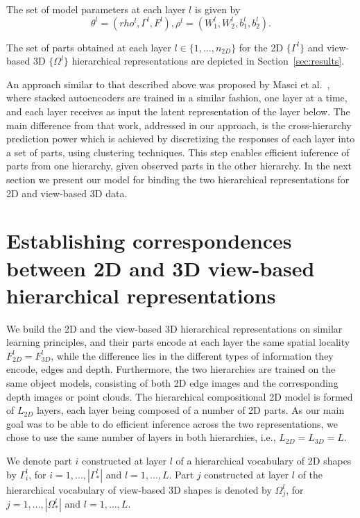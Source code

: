 \documentclass[runningheads]{llncs}
\begin{document}
The set of model parameters at each layer $l$ is  given by
\begin{equation}
\theta^l = (rho^l,\Gamma^l,F^l),
\rho^l=(W_1^l,W_2^l,b_1^l,b_2^l).
\end{equation}

The set of parts obtained at each layer $l\in\{1,\ldots,n_{2D}\}$ for the 2D $\{\Gamma^l\}$ and view-based 3D $\{\Omega^l\}$ hierarchical representations are depicted in Section~\ref{sec:results}.

An approach similar to that described above was proposed by Masci et al.~\cite{Masci2011}, where stacked autoencoders are trained in a similar fashion, one layer at a time, and each layer receives as input the latent representation of the layer below. The main difference from that work, addressed in our approach, is the cross-hierarchy prediction power which is achieved by discretizing the responses of each layer into a set of parts, using clustering techniques. This step enables efficient inference of parts from one hierarchy, given observed parts in the other hierarchy. In the next section we present our model for binding the two hierarchical representations for 2D and view-based 3D data.
 
\section{Establishing correspondences between 2D and 3D view-based hierarchical representations}
\label{sec:analysis}

We build the 2D and the view-based 3D hierarchical representations on similar learning principles, and their parts encode at each layer the same spatial locality $F_{2D}^l=F_{3D}^l$, while the difference lies in the different types of information they encode, edges and depth.
Furthermore, the two hierarchies are trained on the same object models, consisting of both 2D edge images and the corresponding depth images or point clouds.  
The hierarchical compositional 2D model is formed of $L_{2D}$ layers, each layer being composed of a number of 2D parts. 
As our main goal was to be able to do efficient inference across the two representations, we chose to use the same number of layers in both hierarchies, i.e., $L_{2D}=L_{3D}=L$.

We denote part $i$ constructed at layer $l$ of a hierarchical vocabulary of 2D shapes by $\Gamma_{i}^{l}$, for $i=1,\ldots,|\Gamma_*^l|$ and $l=1,\ldots,L$. Part $j$ constructed at layer $l$ of the  hierarchical vocabulary of view-based 3D shapes is denoted by $\Omega_{j}^{l}$, for $j=1,\ldots,|\Omega_*^l|$ and $l=1,\ldots,L$.
\end{document}
